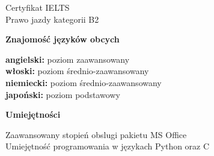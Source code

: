 \documentclass[10	pt]{article}
\begin{document}
Certyfikat IELTS\\
Prawo jazdy kategorii B2\\
\begin{flushleft}
{\textbf{\fontsize{12}{12}\selectfont Znajomość języków obcych}}\\
\hrulefill
\end{flushleft}
\textbf{angielski:} poziom zaawansowany\\
\textbf{włoski:} poziom średnio-zaawansowany\\
\textbf{niemiecki:} poziom średnio-zaawansowany\\
\textbf{japoński:} poziom podstawowy\\
\begin{flushleft}
{\textbf{\fontsize{12}{12}\selectfont Umiejętności}}\\
\hrulefill
\end{flushleft}
Zaawansowany stopień obslugi pakietu MS Office\\
Umiejętność programowania w językach Python oraz C
\end{document}
